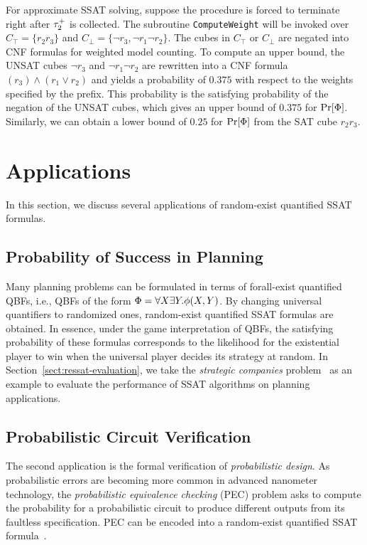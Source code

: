 \begin{example}
    For approximate SSAT solving, suppose the procedure is forced to terminate right after $\tau_2^+$ is collected.
    The subroutine \texttt{ComputeWeight} will be invoked over $C_\top=\{r_2r_3\}$ and $C_\bot=\{\lnot r_3,\lnot r_1 \lnot r_2\}$.
    The cubes in $C_\top$ or $C_\bot$ are negated into CNF formulas for weighted model counting.
    To compute an upper bound,
    the UNSAT cubes $\lnot r_3$ and $\lnot r_1 \lnot r_2$ are rewritten into a CNF formula $(r_3)\land(r_1 \lor r_2)$ and yields a probability of $0.375$ with respect to the weights specified by the prefix.
    This probability is the satisfying probability of the negation of the UNSAT cubes,
    which gives an upper bound of $0.375$ for $\Pr[\Phi]$.
    Similarly, we can obtain a lower bound of $0.25$ for $\Pr[\Phi]$ from the SAT cube $r_2 r_3$.
\end{example}

\section{Applications}
In this section, we discuss several applications of random-exist quantified SSAT formulas.

\subsection{Probability of Success in Planning}
Many planning problems can be formulated in terms of forall-exist quantified QBFs,
i.e., QBFs of the form $\Phi=\forall X \exists Y. \phi(X,Y)$.
By changing universal quantifiers to randomized ones, random-exist quantified SSAT formulas are obtained.
In essence, under the game interpretation of QBFs,
the satisfying probability of these formulas corresponds to the likelihood for the existential player to win when the universal player decides its strategy at random.
In Section~\cref{sect:ressat-evaluation},
we take the \textit{strategic companies} problem~\cite{Cadoli1997}
as an example to evaluate the performance of SSAT algorithms on planning applications.

\subsection{Probabilistic Circuit Verification}
The second application is the formal verification of \textit{probabilistic design}.
As probabilistic errors are becoming more common in advanced nanometer technology,
the \textit{probabilistic equivalence checking} (PEC) problem asks to compute the probability for a probabilistic circuit to produce different outputs from its faultless specification.
PEC can be encoded into a random-exist quantified SSAT formula~\cite{LeeTC18ProbDesign}.


